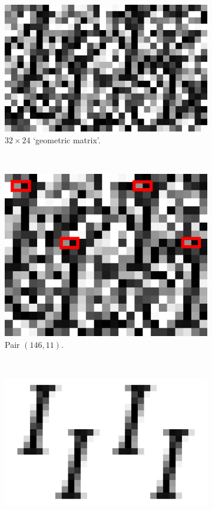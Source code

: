 \documentclass{llncs}
\begin{document}
\begin{figure}[t]
\centering
\begin{subfigure}[t]{0.35\textwidth}
\centering
\includegraphics[scale=.25]{img/Garamond-I_cropped.png}
\caption{$32\times 24$ `geometric matrix'.}
\label{fig-example1a}
\end{subfigure}%
~
\begin{subfigure}[t]{0.20\textwidth}
\centering
\includegraphics[scale=.25]{img/Garamond-I-highlight_cropped.png}
\caption{Pair $(146,11)$.}
\label{fig-example1b}
\end{subfigure}%
~
\begin{subfigure}[t]{0.37\textwidth}
\centering
\includegraphics[scale=.25]{img/Garamond-I-clean_cropped.png}

\end{subfigure}
\end{figure}
\end{document}
